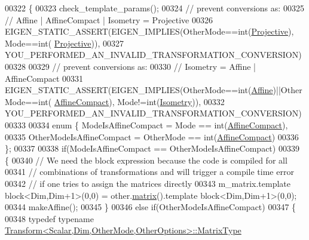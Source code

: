 \begin{DoxyCode}
00322   \{
00323     check\_template\_params();
00324     \textcolor{comment}{// prevent conversions as:}
00325     \textcolor{comment}{// Affine | AffineCompact | Isometry = Projective}
00326     EIGEN\_STATIC\_ASSERT(EIGEN\_IMPLIES(OtherMode==\textcolor{keywordtype}{int}(\hyperlink{group__enums_ggaee59a86102f150923b0cac6d4ff05107aead6a2de12a17aaa4f5c523215dfccad}{Projective}), Mode==\textcolor{keywordtype}{int}(
      \hyperlink{group__enums_ggaee59a86102f150923b0cac6d4ff05107aead6a2de12a17aaa4f5c523215dfccad}{Projective})),
00327                         YOU\_PERFORMED\_AN\_INVALID\_TRANSFORMATION\_CONVERSION)
00328 
00329     \textcolor{comment}{// prevent conversions as:}
00330     \textcolor{comment}{// Isometry = Affine | AffineCompact}
00331     EIGEN\_STATIC\_ASSERT(EIGEN\_IMPLIES(OtherMode==\textcolor{keywordtype}{int}(\hyperlink{group__enums_ggaee59a86102f150923b0cac6d4ff05107a71e768e0581725d919d0b05f4cb83234}{Affine})||OtherMode==\textcolor{keywordtype}{int}(
      \hyperlink{group__enums_ggaee59a86102f150923b0cac6d4ff05107aa30a06b60d218b709020972df47de2b0}{AffineCompact}), Mode!=\textcolor{keywordtype}{int}(\hyperlink{group__enums_ggaee59a86102f150923b0cac6d4ff05107a080cd5366173608f701cd945c2335568}{Isometry})),
00332                         YOU\_PERFORMED\_AN\_INVALID\_TRANSFORMATION\_CONVERSION)
00333 
00334     \textcolor{keyword}{enum} \{ ModeIsAffineCompact = Mode == int(\hyperlink{group__enums_ggaee59a86102f150923b0cac6d4ff05107aa30a06b60d218b709020972df47de2b0}{AffineCompact}),
00335            OtherModeIsAffineCompact = OtherMode == int(\hyperlink{group__enums_ggaee59a86102f150923b0cac6d4ff05107aa30a06b60d218b709020972df47de2b0}{AffineCompact})
00336     \};
00337 
00338     \textcolor{keywordflow}{if}(ModeIsAffineCompact == OtherModeIsAffineCompact)
00339     \{
00340       \textcolor{comment}{// We need the block expression because the code is compiled for all}
00341       \textcolor{comment}{// combinations of transformations and will trigger a compile time error}
00342       \textcolor{comment}{// if one tries to assign the matrices directly}
00343       m\_matrix.template block<Dim,Dim+1>(0,0) = other.\hyperlink{group___geometry___module_aec8168000a88a807130d41020af98d47}{matrix}().template block<Dim,Dim+1>(0,0);
00344       makeAffine();
00345     \}
00346     \textcolor{keywordflow}{else} \textcolor{keywordflow}{if}(OtherModeIsAffineCompact)
00347     \{
00348       \textcolor{keyword}{typedef} \textcolor{keyword}{typename} \hyperlink{group___core___module_class_eigen_1_1_matrix}{Transform<Scalar,Dim,OtherMode,OtherOptions>::MatrixType}

\end{DoxyCode}
